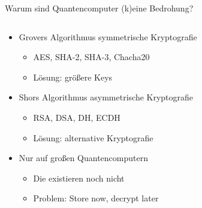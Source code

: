 \documentclass[german]{rosenpass-beamer}
\begin{document}
\begin{frame}{Warum sind Quantencomputer (k)eine Bedrohung?}
\begin{columns}[b]
\begin{column}{.75\textwidth}
\begin{itemize}
  \item Grovers Algorithmus  symmetrische Kryptografie
  \begin{itemize}
    \item AES, SHA-2, SHA-3, Chacha20
    \item Lösung: größere Keys
  \end{itemize}
  \item Shors Algorithmus  asymmetrische Kryptografie
  \begin{itemize}
    \item RSA, DSA, DH, ECDH
    \item Lösung: alternative Kryptografie
  \end{itemize}
  \item  Nur auf großen Quantencomputern
  \begin{itemize}
    \item Die existieren noch nicht
    \item Problem: Store now, decrypt later
  \end{itemize}
\end{itemize}
\end{column}
\begin{column}{.25\textwidth}
%
\par
{}
\end{column}
\end{columns}
\end{frame}
		
\end{document}

